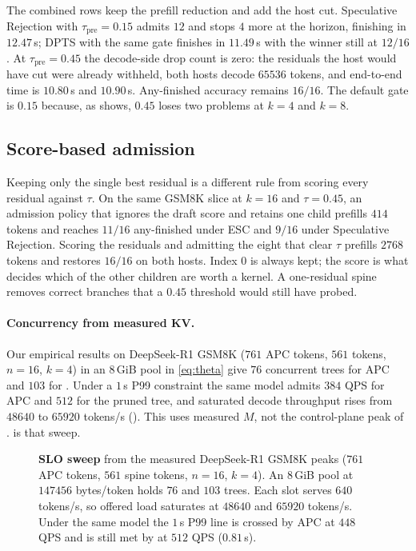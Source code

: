 The combined rows keep the prefill reduction and add the host cut.
Speculative Rejection with $\tau_{\mathrm{pre}}{=}0.15$ admits $12$ and stops $4$ more at the horizon, finishing in $12.47$\,s; DPTS with the same gate finishes in $11.49$\,s with the winner still at $12/16$.
At $\tau_{\mathrm{pre}}{=}0.45$ the decode-side drop count is zero: the residuals the host would have cut were already withheld, both hosts decode $65536$ tokens, and end-to-end time is $10.80$\,s and $10.90$\,s.
Any-finished accuracy remains $16/16$.
The default gate is $0.15$ because, as  shows, $0.45$ loses two problems at $k{=}4$ and $k{=}8$.

\subsection{Score-based admission}
\label{sec:eval-wide}

Keeping only the single best residual is a different rule from scoring every residual against $\tau$.
On the same GSM8K slice at $k{=}16$ and $\tau{=}0.45$, an admission policy that ignores the draft score and retains one child prefills $414$ tokens and reaches $11/16$ any-finished under ESC and $9/16$ under Speculative Rejection.
Scoring the residuals and admitting the eight that clear $\tau$ prefills $2768$ tokens and restores $16/16$ on both hosts.
Index $0$ is always kept; the score is what decides which of the other children are worth a kernel.
A one-residual spine removes correct branches that a $0.45$ threshold would still have probed.

\paragraph{Concurrency from measured KV.}
Our empirical results on DeepSeek-R1 GSM8K ($761$ APC tokens, $561$ \sys tokens, $n{=}16$, $k{=}4$) in an $8$\,GiB pool in \eqref{eq:theta} give $76$ concurrent trees for APC and $103$ for \sys.
Under a $1$\,s P99 \ttft{} constraint the same model admits $384$ QPS for APC and $512$ for the pruned tree, and saturated decode throughput rises from $48640$ to $65920$ tokens/s ().
This uses measured $M$, not the control-plane peak of .
 is that sweep.

\begin{figure}[t]
\centering
\resizebox{\textwidth}{!}{}
\caption{\textbf{SLO sweep} from the measured DeepSeek-R1 GSM8K peaks ($761$ APC tokens, $561$ spine tokens, $n{=}16$, $k{=}4$).
An $8$\,GiB pool at $147456$ bytes/token holds $76$ and $103$ trees.
Each slot serves $640$ tokens/s, so offered load saturates at $48640$ and $65920$ tokens/s.
Under the same model the $1$\,s P99 \ttft{} line is crossed by APC at $448$ QPS and is still met by \sys at $512$ QPS ($0.81$\,s).}
\label{fig:eval-slo}
\end{figure}

